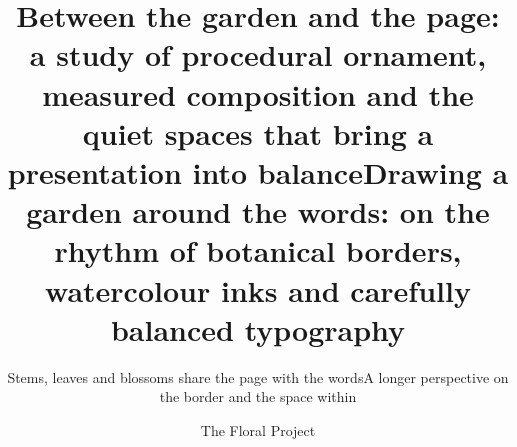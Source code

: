 \documentclass[aspectratio=169]{beamer}
\author{The Floral Project}
\institute{beamer-floral}
\date{}
\begin{document}
\title{Between the garden and the page: a study of procedural ornament, measured composition and the quiet spaces that bring a presentation into balance}
\subtitle{Stems, leaves and blossoms share the page with the words}
\begin{frame}[plain]
  \titlepage
\end{frame}

\title{Drawing a garden around the words: on the rhythm of botanical borders, watercolour inks and carefully balanced typography}
\subtitle{A longer perspective on the border and the space within}
\begin{frame}[plain]
  \titlepage
\end{frame}
\end{document}
